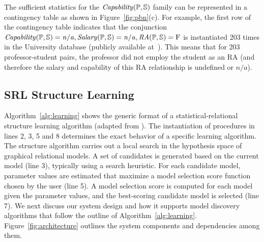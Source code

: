 The sufficient statistics for the $\it{Capability}(\P,\S)$ family can be represented in a contingency table as shown in Figure~\ref{fig:pbn}(c). For example, the first row of the contingency table indicates that the conjunction $\it{Capability}(\P,\S)=n/a,\it{Salary}(\P,\S)=n/a,\it{RA}(\P,\S) =\false$ is instantiated 203 times in the University database (publicly available at~\cite{bib:bbsite}). This means that for 203 professor-student pairs, the professor did not employ the student as an RA (and therefore the salary and capability of this RA relationship is undefined or $n/a$).

\subsection{SRL Structure Learning}

Algorithm~\ref{alg:learning} shows the generic format of a statistical-relational structure learning algorithm (adapted from 
\cite{Kimmig2015}%
). The instantiation of procedures in lines 2, 3, 5 and 8 determines the exact behavior of a specific learning algorithm. The structure algorithm carries out a local search in the hypothesis space of graphical relational models. A set of candidates is generated based on the current model (line 3), typically using a search heuristic. For each candidate model, parameter values are estimated that maximize a model selection score function chosen by the  user (line 5). A model selection score is computed for each model given the parameter values, and the best-scoring candidate model is selected (line 7). 
We next discuss our system design and how it supports model discovery algorithms that follow the outline of Algorithm~\ref{alg:learning}. Figure~\ref{fig:architecture} outlines the system components and dependencies among them.


